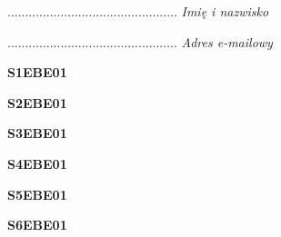 \begin{turn}{90}\begin{minipage}{\linewidth} \vspace{20mm} ................................................  \textit{Imię i nazwisko}\end{minipage}\end{turn}

\begin{turn}{90}\begin{minipage}{\linewidth} \vspace{20mm} ................................................  \textit{Adres e-mailowy}\end{minipage}\end{turn}

\begin{turn}{90}\huge \begin{minipage}{\linewidth} \vspace{10mm}\textbf{S1EBE01}\end{minipage}\end{turn}

\begin{turn}{90}\huge \begin{minipage}{\linewidth} \vspace{10mm}\textbf{S2EBE01}\end{minipage}\end{turn}

\begin{turn}{90}\huge \begin{minipage}{\linewidth} \vspace{10mm}\textbf{S3EBE01}\end{minipage}\end{turn}

\begin{turn}{90}\huge \begin{minipage}{\linewidth} \vspace{10mm}\textbf{S4EBE01}\end{minipage}\end{turn}

\begin{turn}{90}\huge \begin{minipage}{\linewidth} \vspace{10mm}\textbf{S5EBE01}\end{minipage}\end{turn}

\begin{turn}{90}\huge \begin{minipage}{\linewidth} \vspace{10mm}\textbf{S6EBE01}\end{minipage}\end{turn}

